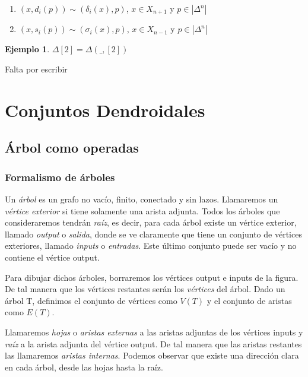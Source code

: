 \documentclass[11pt,a4paper,openright,oneside]{article}
\numberwithin{equation}{section}
\theoremstyle{definition}
\newtheorem{ex}[teo]{Ejemplo}
\begin{document}
\begin{enumerate}[(1)]
    \item $(x, d_i(p)) \sim (\delta_i(x), p)$, $x\in X_{n+1}$ y $p\in|\Delta^n|$
    \item $(x, s_i(p)) \sim (\sigma_i(x), p)$, $x\in X_{n-1}$ y $p\in|\Delta^n|$
\end{enumerate}

\begin{ex}
    $\Delta[2] = \Delta(\_, [2])$
\end{ex}
Falta por escribir



\newpage
\section{Conjuntos Dendroidales}

\subsection{\'Arbol como operadas}
\subsubsection{Formalismo de \'arboles}
Un \emph{\'arbol} es un grafo no vac\'io, finito, conectado y sin lazos. Llamaremos un \emph{v\'ertice exterior} si tiene solamente una arista adjunta.
Todos los \'arboles que consideraremos tendr\'an \emph{ra\'iz}, es decir, para cada \'arbol existe un v\'ertice exterior, llamado \emph{output} o \emph{salida}, donde se ve claramente que tiene un conjunto
de v\'ertices exteriores, llamado \emph{inputs} o \emph{entradas}. Este \'ultimo conjunto puede ser vac\'io y no contiene el v\'ertice output.

Para dibujar dichos \'arboles, borraremos los v\'ertices output e inputs de la figura. De tal manera que los v\'ertices restantes ser\'an los \emph{v\'ertices} del \'arbol.
Dado un \'arbol T, definimos el conjunto de v\'ertices como $V(T)$ y el conjunto de aristas como $E(T)$.

Llamaremos \emph{hojas} o \emph{aristas externas} a las aristas adjuntas de los v\'ertices inputs y \emph{ra\'iz} a la arista adjunta del v\'ertice output.
De tal manera que las aristas restantes las llamaremos \emph{aristas internas}. Podemos observar que existe una direcci\'on clara en cada \'arbol, desde las hojas hasta la ra\'iz.
\end{document}
